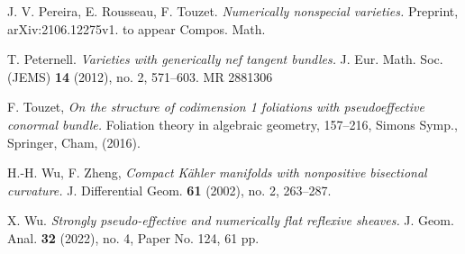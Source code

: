 \documentclass[12pt]{amsart}
\theoremstyle{definition}
\theoremstyle{remark}
\begin{document}
\begin{thebibliography}{n}
J. V. Pereira, E. Rousseau, F. Touzet. 
 \textit{Numerically nonspecial varieties.}
Preprint,  arXiv:2106.12275v1.
to appear  Compos. Math.

T. Peternell.
\textit{Varieties with generically nef tangent bundles.} 
J. Eur. Math. Soc. (JEMS) 
{\bf{14}} (2012), no. 2, 571--603. MR 2881306


 
F. Touzet, 
\textit{On the structure of codimension 1 foliations with pseudoeffective conormal bundle.}
 Foliation theory in algebraic geometry, 
 157--216, Simons Symp., Springer, Cham, (2016). 
 
H.-H. Wu, F. Zheng,
\textit{Compact K\"ahler manifolds with nonpositive bisectional curvature.}
 J. Differential Geom.  {\bf 61}  (2002),  no. 2, 263--287.
 
X. Wu. 
\textit{Strongly pseudo-effective and numerically flat reflexive sheaves.}
 J. Geom. Anal.  {\bf{32}}  (2022),  no. 4, Paper No. 124, 61 pp.





\end{thebibliography}
\end{document}
